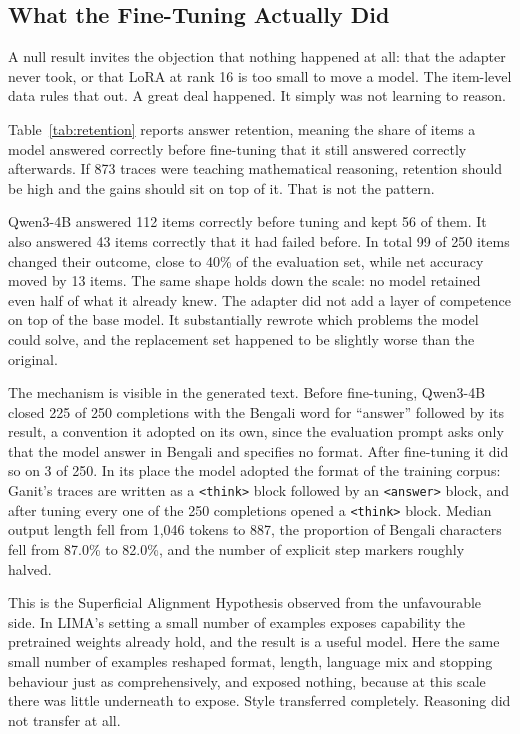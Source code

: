 \subsection{What the Fine-Tuning Actually Did}
\label{sec:retention}

A null result invites the objection that nothing happened at all: that the
adapter never took, or that LoRA at rank 16 is too small to move a model. The
item-level data rules that out. A great deal happened. It simply was not
learning to reason.

Table~\ref{tab:retention} reports answer retention, meaning the share of items
a model answered correctly before fine-tuning that it still answered correctly
afterwards. If 873 traces were teaching mathematical reasoning, retention
should be high and the gains should sit on top of it. That is not the pattern.



Qwen3-4B answered 112 items correctly before tuning and kept 56 of them. It
also answered 43 items correctly that it had failed before. In total 99 of 250
items changed their outcome, close to 40\% of the evaluation set, while net
accuracy moved by 13 items. The same shape holds down the scale: no model
retained even half of what it already knew. The adapter did not add a layer of
competence on top of the base model. It substantially rewrote which problems
the model could solve, and the replacement set happened to be slightly worse
than the original.

The mechanism is visible in the generated text. Before fine-tuning, Qwen3-4B
closed 225 of 250 completions with the Bengali word for ``answer'' followed by
its result, a convention it adopted on its own, since the evaluation prompt
asks only that the model answer in Bengali and specifies no format. After
fine-tuning it did so on 3 of 250. In its place the model adopted the format of
the training corpus: Ganit's traces are written as a \texttt{<think>} block
followed by an \texttt{<answer>} block, and after tuning every one of the 250
completions opened a \texttt{<think>} block. Median output length fell from
1,046 tokens to 887, the proportion of Bengali characters fell from 87.0\% to
82.0\%, and the number of explicit step markers roughly halved.

This is the Superficial Alignment Hypothesis \parencite{zhou2023lima} observed
from the unfavourable side. In LIMA's setting a small number of examples
exposes capability the pretrained weights already hold, and the result is a
useful model. Here the same small number of examples reshaped format, length,
language mix and stopping behaviour just as comprehensively, and exposed
nothing, because at this scale there was little underneath to expose. Style
transferred completely. Reasoning did not transfer at all.


